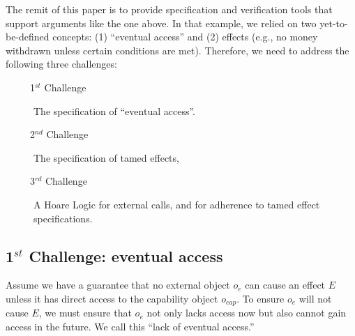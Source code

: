 \noindent
The remit of this paper is to provide specification and verification tools that support arguments like the one above. In that example, we relied on two yet-to-be-defined concepts: (1) ``eventual access'' and (2) \tamed effects (e.g., no money withdrawn unless certain conditions are met).
Therefore, we need to address the following three challenges: 
\begin{description}
\item[\ \ \ \ \  1$^{st}$ Challenge] The specification   of ``eventual  access''. 

\item[\ \ \ \ \   2$^{nd}$ Challenge] The specification of tamed effects, 

\item[\ \ \ \ \  3$^{rd}$ Challenge] A  Hoare Logic for external calls, and for adherence to tamed effect specifications.
\end{description}
%
 
 
\subsection{1$^{st}$ Challenge: eventual access} 


Assume we have a guarantee that no external object $o_e$ can cause an effect $E$ unless it has direct access to the capability object $o_{cap}$. To ensure $o_e$ will not cause $E$, we must ensure that $o_e$ not only lacks access now but also cannot gain access in the future.  We call this  ``lack of eventual access.''

